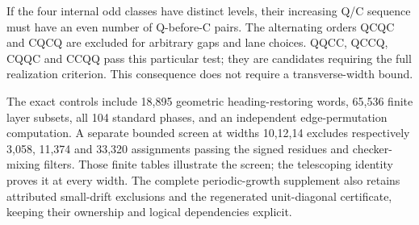 If the four internal odd classes have distinct levels, their increasing
Q/C sequence must have an even number of Q-before-C pairs. The alternating
orders QCQC and CQCQ are excluded for arbitrary gaps and lane choices.
QQCC, QCCQ, CQQC and CCQQ pass this particular test; they are candidates
requiring the full realization criterion. This consequence does not require
a transverse-width bound.

The exact controls include 18,895 geometric heading-restoring words,
65,536 finite layer subsets, all 104 standard phases, and an independent
edge-permutation computation. A separate bounded screen at widths 10,12,14
excludes respectively 3,058, 11,374 and 33,320 assignments passing the signed
residues and checker-mixing filters. Those finite tables illustrate the
screen; the telescoping identity proves it at every width. The complete
periodic-growth supplement also retains attributed small-drift exclusions
and the regenerated unit-diagonal certificate, keeping their ownership and
logical dependencies explicit.
